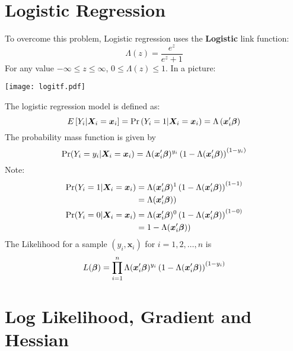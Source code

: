 \documentclass{article}
\newcommand{\bbeta}{\mbox{\boldmath $\beta$}}
\begin{document}
\section*{Logistic Regression}
To overcome this problem, Logistic regression uses the {\bf Logistic} link function:
\begin{equation}
\Lambda(z)=\frac{e^z}{e^z+1}
\end{equation}
For any value $-\infty\leq z\leq \infty$, $0\leq \Lambda(z)\leq 1$. In a picture:
\begin{center}
\texttt{[image: logitf.pdf]}
\end{center}
The logistic regression model is defined as:
\begin{equation}
E\left[Y_i|{\bm X_i}={\bm x_i}\right]=\mbox{Pr}\left(Y_i=1|{\bm X_i}={\bm x_i}\right)=\Lambda\left({{\bm x'_i}\bbeta}\right)
\end{equation}
The probability mass function is given by
\begin{equation}
\mbox{Pr}(Y_i=y_i|{\bm X_i}={\bm x_i})=\Lambda({{\bm x'_i}\bbeta})^{y_i}\left(1-\Lambda({{\bm x'_i}\bbeta})\right)^{(1-y_i)}
\end{equation}
Note:
\begin{align*}
\mbox{Pr}(Y_i=1|{\bm X_i}={\bm x_i})&=\Lambda({{\bm x'_i}\bbeta})^{1}\left(1-\Lambda({{\bm x'_i}\bbeta})\right)^{(1-1)}\\
&=\Lambda({{\bm x'_i}\bbeta}))\\
\mbox{Pr}(Y_i=0|{\bm X_i}={\bm x_i})&=\Lambda({{\bm x'_i}\bbeta})^{0}\left(1-\Lambda({{\bm x'_i}\bbeta})\right)^{(1-0)}\\
&=1-\Lambda({{\bm x'_i}\bbeta}))\\
\end{align*}
The Likelihood for a sample $\left(y_i,{\bm x_i}\right)$ for $i=1,2,\ldots,n$ is
\begin{equation}
L(\bbeta)=\prod_{i=1}^n \Lambda({{\bm x'_i}\bbeta})^{y_i}\left(1-\Lambda({{\bm x'_i}\bbeta})\right)^{(1-y_i)} 
\end{equation}
\section*{Log Likelihood, Gradient and Hessian}
\end{document}
